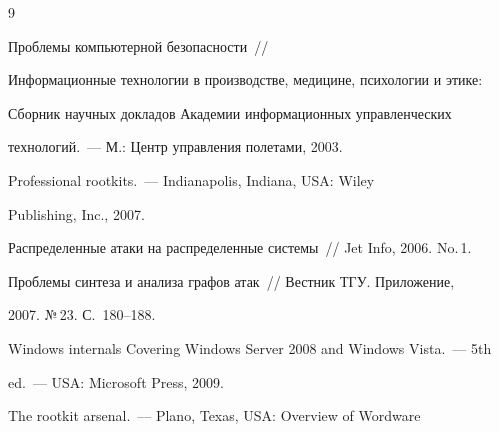  {\small\frenchspacing


{%




\begin{thebibliography}{9}


    


     




 Проблемы компьютерной безопасности~/\!\!/ 


Информационные технологии в производстве, медицине, психологии и этике: 


Сборник научных докладов Академии информационных управленческих 


технологий.~--- М.: Центр управления полетами, 2003.







 Professional rootkits.~--- Indianapolis, Indiana, USA: Wiley 


Publishing, Inc., 2007.









Распределенные атаки на распределенные системы~/\!\!/ Jet Info, 2006. No.\,1.









Проблемы синтеза и анализа графов атак~/\!\!/ Вестник ТГУ. Приложение, 


2007. №\,23. С.~180--188.









Windows internals Covering Windows Server 2008 and Windows Vista.~--- 5th 


ed.~--- USA: Microsoft Press, 2009.







 The rootkit arsenal.~--- Plano, Texas, USA: Overview of Wordware 



\end{thebibliography}}}
